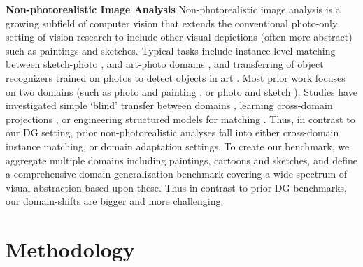 \documentclass[10pt,twocolumn,letterpaper]{article}
\begin{document}
\noindent\textbf{Non-photorealistic Image Analysis}\quad
Non-photorealistic image analysis is a growing subfield of computer vision that extends the conventional photo-only setting of vision research to include other visual depictions (often more abstract) such as paintings and sketches. Typical tasks include instance-level matching between sketch-photo \cite{yu2016sketchShoe,sangkloy2016sketchy}, and art-photo domains \cite{crowley2015facePainting}, and transferring of object recognizers trained on photos to detect objects in art \cite{crowley2016artDetection,wu2014matchAcrossStyle}. Most prior work focuses on two domains (such as photo and painting \cite{crowley2016artDetection,wu2014matchAcrossStyle}, or photo and sketch \cite{yu2016sketchShoe,sangkloy2016sketchy}). Studies have investigated simple `blind' transfer between domains \cite{crowley2016artDetection}, learning cross-domain projections \cite{yu2016sketchShoe,crowley2015facePainting}, or engineering structured models for matching \cite{wu2014matchAcrossStyle}. Thus, in contrast to our DG setting, prior non-photorealistic analyses fall into either cross-domain instance matching, or domain adaptation settings. To create our benchmark, we aggregate multiple domains including paintings, cartoons and sketches, and define a comprehensive domain-generalization benchmark covering a wide spectrum of visual abstraction based upon these. Thus in contrast to prior DG benchmarks, our domain-shifts are bigger and more challenging. 

\section{Methodology}
\end{document}
